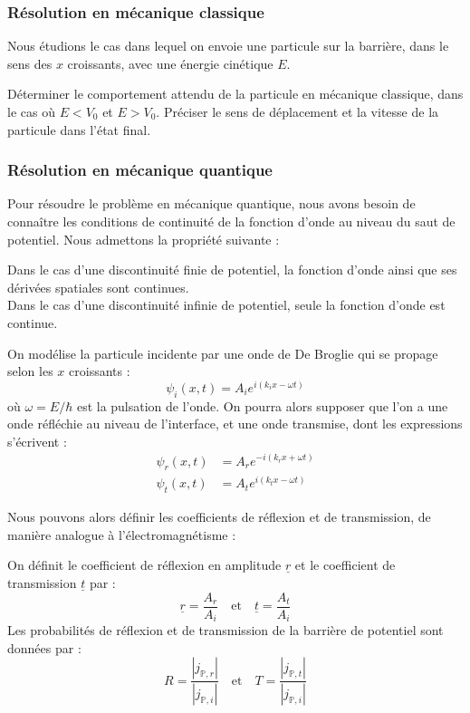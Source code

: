 \documentclass[11pt,fleqn]{book} %
\begin{document}
\subsubsection{Résolution en mécanique classique}

Nous étudions le cas dans lequel on envoie une particule sur la barrière, dans le sens des $x$ croissants, avec une énergie cinétique $E$.
\begin{capex}
	Déterminer le comportement attendu de la particule en mécanique classique, dans le cas où $E<V_0$ et $E>V_0$. Préciser le sens de déplacement et la vitesse de la particule dans l'état final.
\end{capex}

\subsubsection{Résolution en mécanique quantique}

Pour résoudre le problème en mécanique quantique, nous avons besoin de connaître les conditions de continuité de la fonction d'onde au niveau du saut de potentiel. Nous admettons la propriété suivante :
\begin{proposition}
	Dans le cas d'une discontinuité finie de potentiel, la fonction d'onde ainsi que ses dérivées spatiales sont continues.\\
	Dans le cas d'une discontinuité infinie de potentiel, seule la fonction d'onde est continue.
\end{proposition}

On modélise la particule incidente par une onde de De Broglie qui se propage selon les $x$ croissants :
\begin{equation}
	\psi_i(x,t) = A_i e^{i(k_i x-\omega t)}
\end{equation}
où $\omega = E/\hbar$ est la pulsation de l'onde. 
On pourra alors supposer que l'on a une onde réfléchie au niveau de l'interface, et une onde transmise, dont les expressions s'écrivent :
\begin{align}
	\psi_r(x,t) &= A_r e^{-i(k_r x + \omega t)} \\
	\psi_t(x,t) &= A_t e^{i(k_t x - \omega t)}
\end{align}

Nous pouvons alors définir les coefficients de réflexion et de transmission, de manière analogue à l'électromagnétisme :
\begin{definition}
	On définit le coefficient de réflexion en amplitude $\underline{r}$ et le coefficient de transmission $\underline{t}$ par :
	\begin{equation}
		\underline{r} = \frac{A_r}{A_i} \quad \mathrm{et} \quad \underline{t} = \frac{A_t}{A_i}
	\end{equation}
	Les probabilités de réflexion et de transmission de la barrière de potentiel sont données par :
	\begin{equation}
		R = \frac{|j_{\mathbb{P},r}|}{|j_{\mathbb{P},i}|} \quad \mathrm{et} \quad T = \frac{|j_{\mathbb{P},t}|}{|j_{\mathbb{P},i}|}
	\end{equation}
\end{definition}
\end{document}
